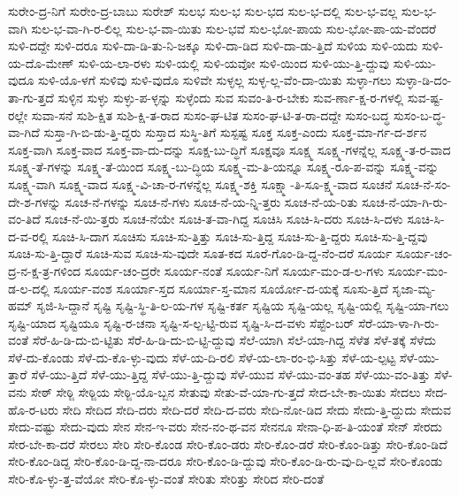 {ಸುರೇಂ-ದ್ರ-ನಿಗೆ
ಸುರೇಂ-ದ್ರ-ಬಾಬು
ಸುರೇಶ್
ಸುಲಭ
ಸುಲ-ಭ
ಸುಲ-ಭದ
ಸುಲ-ಭ-ದಲ್ಲಿ
ಸುಲ-ಭ-ವಲ್ಲ
ಸುಲ-ಭ-ವಾಗಿ
ಸುಲ-ಭ-ವಾ-ಗಿ-ರ-ಲಿಲ್ಲ
ಸುಲ-ಭ-ವಾ-ಯಿತು
ಸುಲ-ಭವೆ
ಸುಲ-ಭೋ-ಪಾಯ
ಸುಲ-ಭೋ-ಪಾ-ಯ-ವೆಂದರೆ
ಸುಳಿ-ದದ್ದೇ
ಸುಳಿ-ದರೂ
ಸುಳಿ-ದಾ-ಡಿ-ತು-ನಿ-ಜಕ್ಕೂ
ಸುಳಿ-ದಾ-ಡಿದ
ಸುಳಿ-ದಾ-ಡು-ತ್ತಿದೆ
ಸುಳಿಯ
ಸುಳಿ-ಯದು
ಸುಳಿ-ಯ-ದೊ-ಮೇಣ್
ಸುಳಿ-ಯ-ಲಾ-ರಳು
ಸುಳಿ-ಯಲ್ಲಿ
ಸುಳಿ-ಯವೋ
ಸುಳಿ-ಯಿಂದ
ಸುಳಿ-ಯು-ತ್ತಿ-ದ್ದುವು
ಸುಳಿ-ಯು-ವುದೂ
ಸುಳಿ-ಯೊ-ಳಗೆ
ಸುಳಿವು
ಸುಳಿ-ವುದೊ
ಸುಳಿವೇ
ಸುಳ್ಳಲ್ಲ
ಸುಳ್ಳ-ಲ್ಲ-ವೆಂ-ದಾ-ಯಿತು
ಸುಳ್ಳಾ-ಗಲು
ಸುಳ್ಳಾ-ಡಿ-ದಂ-ತಾ-ಗು-ತ್ತದೆ
ಸುಳ್ಳಿನ
ಸುಳ್ಳು
ಸುಳ್ಳು-ಪ-ಳ್ಳನ್ನು
ಸುಳ್ಳೆಂದು
ಸುವ
ಸುವಂ-ತಿ-ರ-ಬೇಕು
ಸುವ-ರ್ಣಾ-ಕ್ಷ-ರ-ಗಳಲ್ಲಿ
ಸುವ-ಷ್ಟ-ರಲ್ಲೇ
ಸುವಾ-ಸನೆ
ಸುಶಿ-ಕ್ಷಿತ
ಸುಶಿ-ಕ್ಷಿ-ತ-ರಾದ
ಸುಸಂ-ಘ-ಟಿತ
ಸುಸಂ-ಘ-ಟಿ-ತ-ರಾ-ದದ್ದೇ
ಸುಸಂ-ಬದ್ಧ
ಸುಸಂ-ಬ-ದ್ಧ-ವಾ-ಗಿದೆ
ಸುಸ್ತಾ-ಗಿ-ಬಿ-ಡು-ತ್ತಿ-ದ್ದರು
ಸುಸ್ತಾದ
ಸುಸ್ಥಿ-ತಿಗೆ
ಸುಸ್ಪಷ್ಟ
ಸೂಕ್ತ
ಸೂಕ್ತ-ಎಂದು
ಸೂಕ್ತ-ಮಾ-ರ್ಗ-ದ-ರ್ಶನ
ಸೂಕ್ತ-ವಾಗಿ
ಸೂಕ್ತ-ವಾದ
ಸೂಕ್ತ-ವಾ-ದು-ದನ್ನು
ಸೂಕ್ಷ-ಬು-ದ್ಧಿಗೆ
ಸೂಕ್ಷವೂ
ಸೂಕ್ಷ್ಮ
ಸೂಕ್ಷ್ಮ-ಗಳನ್ನೆಲ್ಲ
ಸೂಕ್ಷ್ಮ-ತ-ರ-ವಾದ
ಸೂಕ್ಷ್ಮ-ತೆ-ಗಳನ್ನು
ಸೂಕ್ಷ್ಮ-ತೆ-ಯಿಂದ
ಸೂಕ್ಷ್ಮ-ಬು-ದ್ಧಿಯ
ಸೂಕ್ಷ್ಮ-ಮ-ತಿ-ಯನ್ನೂ
ಸೂಕ್ಷ್ಮ-ರೂ-ಪ-ವನ್ನು
ಸೂಕ್ಷ್ಮ-ವನ್ನು
ಸೂಕ್ಷ್ಮ-ವಾಗಿ
ಸೂಕ್ಷ್ಮ-ವಾದ
ಸೂಕ್ಷ್ಮ-ವಿ-ಚಾ-ರ-ಗಳನ್ನೆಲ್ಲ
ಸೂಕ್ಷ್ಮ-ಶಕ್ತಿ
ಸೂಕ್ಷ್ಮಾ-ತಿ-ಸೂ-ಕ್ಷ್ಮ-ವಾದ
ಸೂಚನೆ
ಸೂಚ-ನೆ-ಸಂ-ದೇ-ಶ-ಗಳನ್ನು
ಸೂಚ-ನೆ-ಗಳನ್ನು
ಸೂಚ-ನೆ-ಗಳು
ಸೂಚ-ನೆ-ಯ-ನ್ನಿ-ತ್ತರು
ಸೂಚ-ನೆ-ಯ-ರಿತು
ಸೂಚ-ನೆ-ಯಾ-ಗಿ-ರು-ವಂ-ತಿದೆ
ಸೂಚ-ನೆ-ಯಿ-ತ್ತರು
ಸೂಚ-ನೆಯೇ
ಸೂಚಿ-ತ-ವಾ-ಗಿದ್ದ
ಸೂಚಿಸಿ
ಸೂಚಿ-ಸಿ-ದರು
ಸೂಚಿ-ಸಿ-ದಳು
ಸೂಚಿ-ಸಿ-ದ-ವ-ರಲ್ಲಿ
ಸೂಚಿ-ಸಿ-ದಾಗ
ಸೂಚಿಸು
ಸೂಚಿ-ಸು-ತ್ತಿತ್ತು
ಸೂಚಿ-ಸು-ತ್ತಿದ್ದ
ಸೂಚಿ-ಸು-ತ್ತಿ-ದ್ದರು
ಸೂಚಿ-ಸು-ತ್ತಿ-ದ್ದವು
ಸೂಚಿ-ಸು-ತ್ತಿ-ದ್ದಾರೆ
ಸೂಚಿ-ಸುವ
ಸೂಚಿ-ಸು-ವುದೇ
ಸೂತ-ಕದ
ಸೂರೆ-ಗೊಂ-ಡಿ-ದ್ದ-ನೆಂ-ದರೆ
ಸೂರ್ಯ
ಸೂರ್ಯ-ಚಂ-ದ್ರ-ನ-ಕ್ಷ-ತ್ರ-ಗಳಿಂದ
ಸೂರ್ಯ-ಚಂ-ದ್ರರೇ
ಸೂರ್ಯ-ನಂತೆ
ಸೂರ್ಯ-ನಿಗೆ
ಸೂರ್ಯ-ಮಂ-ಡ-ಲ-ಗಳು
ಸೂರ್ಯ-ಮಂ-ಡ-ಲ-ದಲ್ಲಿ
ಸೂರ್ಯ-ವಂಶ
ಸೂರ್ಯಾ-ಸ್ತದ
ಸೂರ್ಯಾ-ಸ್ತ-ಮಾನ
ಸೂರ್ಯೋ-ದ-ಯಕ್ಕೆ
ಸೂಸು-ತ್ತಿದೆ
ಸೃಜಾ-ಮ್ಯ-ಹಮ್
ಸೃಜಿ-ಸಿ-ದ್ದಾನೆ
ಸೃಷ್ಟಿ
ಸೃಷ್ಟಿ-ಸ್ಥಿ-ತಿ-ಲ-ಯ-ಗಳ
ಸೃಷ್ಟಿ-ಕರ್ತ
ಸೃಷ್ಟಿಯ
ಸೃಷ್ಟಿ-ಯಲ್ಲ
ಸೃಷ್ಟಿ-ಯಲ್ಲಿ
ಸೃಷ್ಟಿ-ಯಾ-ಗಲು
ಸೃಷ್ಟಿ-ಯಾದ
ಸೃಷ್ಟಿಯೂ
ಸೃಷ್ಟಿ-ರ-ಚನಾ
ಸೃಷ್ಟಿ-ಸ-ಲ್ಪ-ಟ್ಟಿ-ರುವ
ಸೃಷ್ಟಿ-ಸಿ-ದ-ವಳು
ಸೆಪ್ಟೆಂ-ಬರ್
ಸೆರೆ-ಯಾ-ಳಾ-ಗಿ-ರು-ವಂತೆ
ಸೆರೆ-ಹಿ-ಡಿ-ದು-ಬಿ-ಟ್ಟಿತು
ಸೆರೆ-ಹಿ-ಡಿ-ದು-ಬಿ-ಟ್ಟಿ-ದ್ದುವು
ಸೆಲೆ-ಯಾಗಿ
ಸೆಲೆ-ಯಾ-ಗಿದ್ದ
ಸೆಳೆತ
ಸೆಳೆ-ತಕ್ಕೆ
ಸೆಳೆದು
ಸೆಳೆ-ದು-ಕೊಂಡು
ಸೆಳೆ-ದು-ಕೊ-ಳ್ಳು-ವುದು
ಸೆಳೆ-ಯ-ದಿ-ರಲಿ
ಸೆಳೆ-ಯ-ಲಾ-ರಂ-ಭಿ-ಸಿತ್ತು
ಸೆಳೆ-ಯ-ಲ್ಪಟ್ಟ
ಸೆಳೆ-ಯು-ತ್ತಾರೆ
ಸೆಳೆ-ಯು-ತ್ತಿದೆ
ಸೆಳೆ-ಯು-ತ್ತಿದ್ದ
ಸೆಳೆ-ಯು-ತ್ತಿ-ದ್ದುವು
ಸೆಳೆ-ಯುವ
ಸೆಳೆ-ಯು-ವಂ-ತಹ
ಸೆಳೆ-ಯು-ವಂ-ತಿತ್ತು
ಸೆಳೆ-ವನು
ಸೇಠ್
ಸೇಠ್ಜಿ
ಸೇಠ್ಜಿಯ
ಸೇಠ್ಜಿ-ಯೊ-ಬ್ಬನ
ಸೇತುವು
ಸೇತು-ವೆ-ಯಾ-ಗು-ತ್ತದೆ
ಸೇದ-ಬೇ-ಕಾ-ಯಿತು
ಸೇದಲು
ಸೇದ-ಹೊ-ರ-ಟರು
ಸೇದಿ
ಸೇದಿದ
ಸೇದಿ-ದರು
ಸೇದಿ-ದರೆ
ಸೇದಿ-ದ-ವರು
ಸೇದಿ-ನೋ-ಡಿದ
ಸೇದು
ಸೇದು-ತ್ತಿ-ದ್ದುದು
ಸೇದುವ
ಸೇದು-ವಷ್ಟು
ಸೇದು-ವುದು
ಸೇನ
ಸೇನ-ಇ-ವರು
ಸೇನ-ನಂ-ಥ-ವನ
ಸೇನನೂ
ಸೇನಾ-ಧಿ-ಪ-ತಿ-ಯಂತೆ
ಸೇನ್
ಸೇರದು
ಸೇರ-ಬೇ-ಕಾ-ದರೆ
ಸೇರಲು
ಸೇರಿ
ಸೇರಿ-ಕೊಂಡ
ಸೇರಿ-ಕೊಂ-ಡರು
ಸೇರಿ-ಕೊಂ-ಡರೆ
ಸೇರಿ-ಕೊಂ-ಡಿತ್ತು
ಸೇರಿ-ಕೊಂ-ಡಿದೆ
ಸೇರಿ-ಕೊಂ-ಡಿದ್ದ
ಸೇರಿ-ಕೊಂ-ಡಿ-ದ್ದ-ನಾ-ದರೂ
ಸೇರಿ-ಕೊಂ-ಡಿ-ದ್ದುವು
ಸೇರಿ-ಕೊಂ-ಡಿ-ರು-ವು-ದಿ-ಲ್ಲವೆ
ಸೇರಿ-ಕೊಂಡು
ಸೇರಿ-ಕೊ-ಳ್ಳು-ತ್ತ-ವೆಯೋ
ಸೇರಿ-ಕೊ-ಳ್ಳು-ವಂತೆ
ಸೇರಿತು
ಸೇರಿತ್ತು
ಸೇರಿದ
ಸೇರಿ-ದಂತೆ
}
